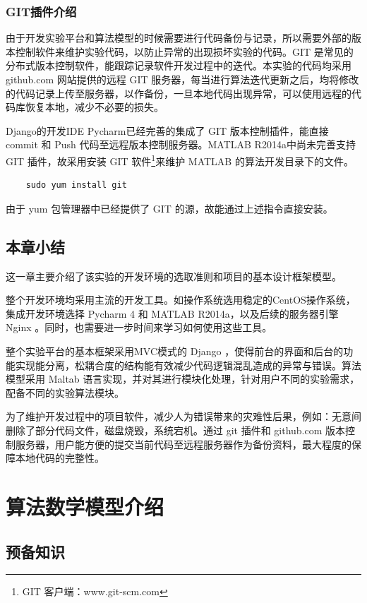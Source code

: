 \documentclass[oneside]{ZJUthesis}
\begin{document}
\subsection{GIT插件介绍}
由于开发实验平台和算法模型的时候需要进行代码备份与记录，所以需要外部的版本控制软件来维护实验代码，以防止异常的出现损坏实验的代码。GIT 是常见的分布式版本控制软件，能跟踪记录软件开发过程中的迭代。本实验的代码均采用 github.com 网站提供的远程 GIT 服务器，每当进行算法迭代更新之后，均将修改的代码记录上传至服务器，以作备份，一旦本地代码出现异常，可以使用远程的代码库恢复本地，减少不必要的损失。

Django的开发IDE Pycharm已经完善的集成了 GIT 版本控制插件，能直接 commit 和 Push 代码至远程版本控制服务器。MATLAB R2014a中尚未完善支持 GIT 插件，故采用安装 GIT 软件\footnote{GIT 客户端：www.git-scm.com}来维护 MATLAB 的算法开发目录下的文件。

\begin{verbatim}     
    sudo yum install git
\end{verbatim}
由于 yum 包管理器中已经提供了 GIT 的源，故能通过上述指令直接安装。


\section{本章小结}
这一章主要介绍了该实验的开发环境的选取准则和项目的基本设计框架模型。

整个开发环境均采用主流的开发工具。如操作系统选用稳定的CentOS操作系统，集成开发环境选择 Pycharm 4 和 MATLAB R2014a，以及后续的服务器引擎 Nginx 。同时，也需要进一步时间来学习如何使用这些工具。

整个实验平台的基本框架采用MVC模式的 Django ，使得前台的界面和后台的功能实现能分离，松耦合度的结构能有效减少代码逻辑混乱造成的异常与错误。算法模型采用 Maltab 语言实现，并对其进行模块化处理，针对用户不同的实验需求，配备不同的实验算法模块。

为了维护开发过程中的项目软件，减少人为错误带来的灾难性后果，例如：无意间删除了部分代码文件，磁盘烧毁，系统宕机。通过 git 插件和 github.com 版本控制服务器，用户能方便的提交当前代码至远程服务器作为备份资料，最大程度的保障本地代码的完整性。


\chapter{算法数学模型介绍}
\section{预备知识}
\end{document}

